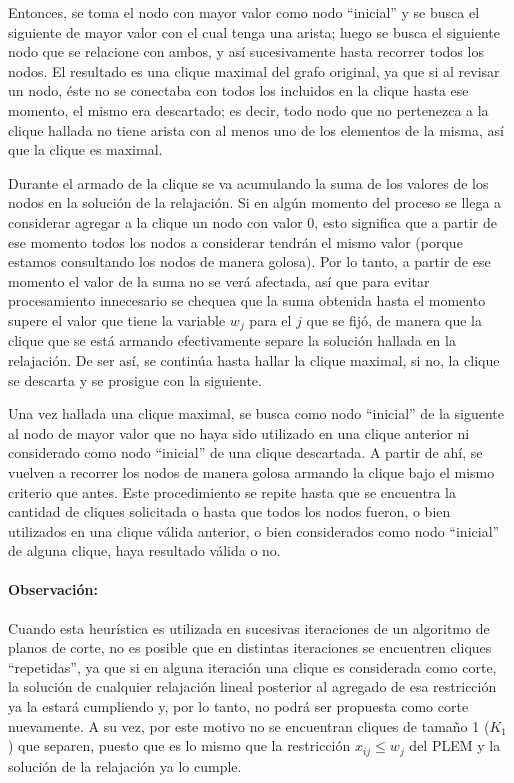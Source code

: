 \documentclass[a4paper]{article}
\begin{document}
Entonces, se toma el nodo con mayor valor como nodo ``inicial'' y se busca el siguiente de mayor valor con el cual tenga una arista; luego se busca el siguiente nodo que se relacione con ambos, y así sucesivamente hasta recorrer todos los nodos.  El resultado es una clique maximal del grafo original, ya que si al revisar un nodo, éste no se conectaba con todos los incluidos en la clique hasta ese momento, el mismo era descartado; es decir, todo nodo que no pertenezca a la clique hallada no tiene arista con al menos uno de los elementos de la misma, así que la clique es maximal.

Durante el armado de la clique se va acumulando la suma de los valores de los nodos en la solución de la relajación.  Si en algún momento del proceso se llega a considerar agregar a la clique un nodo con valor 0, esto significa que a partir de ese momento todos los nodos a considerar tendrán el mismo valor (porque estamos consultando los nodos de manera golosa).  Por lo tanto, a partir de ese momento el valor de la suma no se verá afectada, así que para evitar procesamiento innecesario se chequea que la suma obtenida hasta el momento supere el valor que tiene la variable $w_j$ para el $j$ que se fijó, de manera que la clique que se está armando efectivamente separe la solución hallada en la relajación.  De ser así, se continúa hasta hallar la clique maximal, si no, la clique se descarta y se prosigue con la siguiente.

Una vez hallada una clique maximal, se busca como nodo ``inicial'' de la siguente al nodo de mayor valor que no haya sido utilizado en una clique anterior ni considerado como nodo ``inicial'' de una clique descartada.  A partir de ahí, se vuelven a recorrer los nodos de manera golosa armando la clique bajo el mismo criterio que antes. Este procedimiento se repite hasta que se encuentra la cantidad de cliques solicitada o hasta que todos los nodos fueron, o bien utilizados en una clique válida anterior, o bien considerados como nodo ``inicial'' de alguna clique, haya resultado válida o no. 

\paragraph*{Observación:} Cuando esta heurística es utilizada en sucesivas iteraciones de un algoritmo de planos de corte, no es posible que en distintas iteraciones se encuentren cliques ``repetidas'', ya que si en alguna iteración una clique es considerada como corte, la solución de cualquier relajación lineal posterior al agregado de esa restricción ya la estará cumpliendo y, por lo tanto, no podrá ser propuesta como corte nuevamente. A su vez, por este motivo no se encuentran cliques de tamaño 1 ($K_1$) que separen, puesto que es lo mismo que la restricción $x_{ij} \leq w_j$ del PLEM y la solución de la relajación ya lo cumple.
\end{document}

